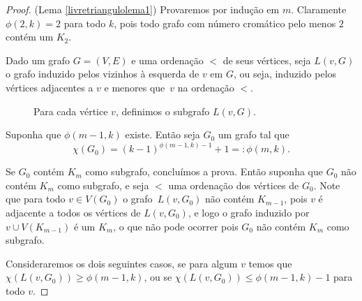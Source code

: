 \begin{proof}(Lema \ref{livretriangulolema1})
Provaremos por indução em $m$. Claramente $\phi(2,k) = 2$ para todo $k$, pois todo grafo com número cromático pelo menos $2$ contém um $K_2$.

Dado um grafo $G = (V,E)$ e uma ordenação $<$ de seus vértices, seja $L(v,G)$ o grafo induzido pelos vizinhos à esquerda de $v$ em $G$, ou seja, induzido pelos vértices adjacentes a $v$ e menores que~$v$ na ordenação $<$.

\begin{figure}[H]
\centering
{}
\caption{Para cada vértice $v$, definimos o subgrafo $L(v,G)$.}
\label{fig:leftneighbor}
\end{figure}

Suponha que $\phi(m-1,k)$ existe. Então seja $G_0$ um grafo tal que \[\chi(G_0) = (k-1)^{\phi(m-1,k)-1}+1 =: \phi(m,k).\]

Se $G_0$ contém $K_m$ como subgrafo, concluímos a prova. Então suponha que $G_0$ não contém $K_m$ como subgrafo, e seja $<$ uma ordenação dos vértices de $G_0$. Note que para todo $v \in V(G_0)$ o grafo~$L(v,G_0)$ não contém $K_{m-1}$, pois $v$ é adjacente a todos os vértices de $L(v,G_0)$, e logo o grafo induzido por $v\cup V(K_{m-1})$ é um $K_{m}$, o que não pode ocorrer pois $G_0$ não contém $K_m$ como subgrafo.

Consideraremos os dois seguintes casos, se para algum $v$ temos que $\chi(L(v,G_0)) \geq \phi(m-1,k)$, ou se $\chi(L(v,G_0)) \leq \phi(m-1,k) - 1$ para todo $v$.


\end{proof}
